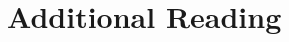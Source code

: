 \chapter*{Additional Reading}
\nocite{lim:etal:kdtei:2016,markdown:overleaf}   %

{\renewcommand{\bibsection}{}


}